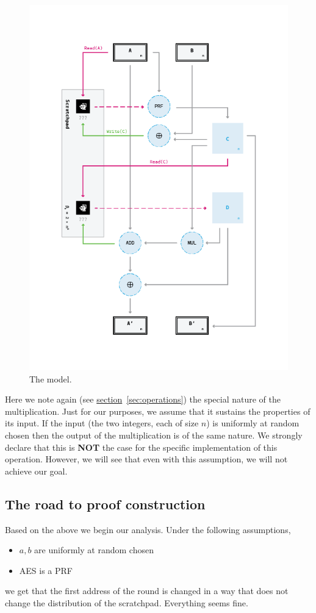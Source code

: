 \begin{figure}[H]
  \centering
  \includegraphics[scale=0.55, keepaspectratio]{Images/Bill/model.png}
  \caption{The model.~\cite{bill}}
  \label{fig:model}
\end{figure}

Here we note again (see \hyperref[sec:operations]{section}~\ref{sec:operations}) the special nature of the multiplication. Just for our purposes, we assume that it sustains the properties of its input. If the input (the two integers, each of size $n$) is uniformly at random chosen then the output of the multiplication is of the same nature. We strongly declare that this is \textbf{NOT} the case for the specific implementation of this operation. However, we will see that even with this assumption, we will not achieve our goal.

\subsection{The road to proof construction}
Based on the above we begin our analysis. Under the following assumptions,
\begin{itemize}
  \item $a,b$ are uniformly at random chosen
  \item AES is a PRF
\end{itemize}
we get that the first address of the round is changed in a way that does not change the distribution of the scratchpad. Everything seems fine.

